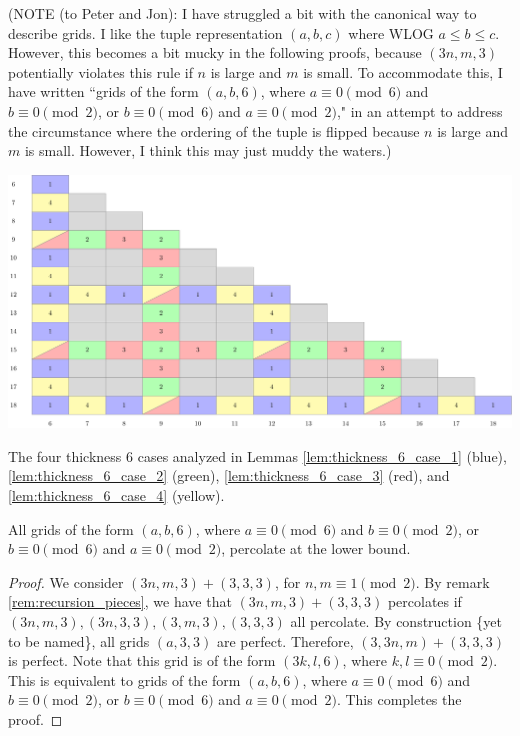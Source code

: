 (NOTE (to Peter and Jon): I have struggled a bit with the canonical way to describe grids. I like the tuple representation $(a,b,c)$ where WLOG $a \leq b \leq c$. However, this becomes a bit mucky in the following proofs, because $(3n,m,3)$ potentially violates this rule if $n$ is large and $m$ is small. To accommodate this, I have written ``grids of the form $(a,b,6)$, where $a \equiv 0 \pmod 6$ and $b \equiv 0 \pmod 2$, or $b \equiv 0 \pmod 6$ and $a \equiv 0 \pmod 2$," in an attempt to address the circumstance where the ordering of the tuple is flipped because $n$ is large and $m$ is small. However, I think this may just muddy the waters.)


\begin{table}[]
\centering
\includegraphics[width=\textwidth]{tables/4/thickness_6_cases.pdf}
\caption{The four thickness 6 cases analyzed in Lemmas \ref{lem:thickness_6_case_1} (blue), \ref{lem:thickness_6_case_2} (green), \ref{lem:thickness_6_case_3} (red), and \ref{lem:thickness_6_case_4} (yellow).}
\label{fig:thickness_6_cases}
\end{table}

\begin{lem}
\label{lem:thickness_6_case_1}
All grids of the form $(a,b,6)$, where $a \equiv 0 \pmod 6$ and $b \equiv 0 \pmod 2$, or $b \equiv 0 \pmod 6$ and $a \equiv 0 \pmod 2$, percolate at the lower bound.
\end{lem}

\begin{proof}
We consider $(3n,m,3) + (3,3,3)$, for $n,m \equiv 1 \pmod 2$. By remark \ref{rem:recursion_pieces}, we have that $(3n,m,3) + (3,3,3)$ percolates if $(3n,m,3), (3n,3,3), (3,m,3),(3,3,3)$ all percolate. By construction \{yet to be named\}, all grids $(a,3,3)$ are perfect. Therefore, $(3,3n,m) + (3,3,3)$ is perfect. Note that this grid is of the form $(3k, l, 6)$, where $k,l \equiv 0 \pmod 2$. This is equivalent to grids of the form $(a,b,6)$, where $a \equiv 0 \pmod 6$ and $b \equiv 0 \pmod 2$, or $b \equiv 0 \pmod 6$ and $a \equiv 0 \pmod 2$. This completes the proof.
\end{proof}


